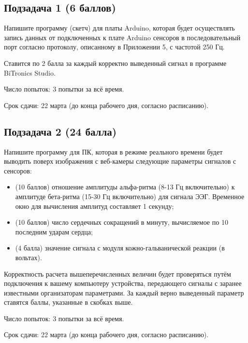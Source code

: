 
\subsection*{Подзадача 1 (6 баллов)}

Напишите программу (скетч) для платы Arduino, которая будет осуществлять запись данных от подключенных к плате Arduino сенсоров в последовательный порт согласно протоколу, описанному в Приложении 5, с частотой 250 Гц.

\markSection

Ставится по 2 балла за каждый корректно выведенный сигнал в программе BiTronics Studio.

Число попыток: 3 попытки за всё время.

Срок сдачи: 22 марта (до конца рабочего дня, согласно расписанию).

\subsection*{Подзадача 2 (24 балла)}

Напишите программу для ПК, которая в режиме реального времени будет выводить поверх изображения с веб-камеры следующие параметры сигналов с сенсоров:
\begin{itemize}
    \item (10 баллов) отношение амплитуды альфа-ритма (8-13 Гц включительно) к амплитуде бета-ритма (15-30 Гц включительно) для сигнала ЭЭГ. Временное окно для вычисления амплитуд составляет 1 секунду;
    \item (10 баллов) число сердечных сокращений в минуту, вычисляемое по 10 последним ударам сердца;
    \item (4 балла) значение сигнала с модуля кожно-гальванической реакции (в вольтах).
\end{itemize}

\markSection

Корректность расчета вышеперечисленных величин будет проверяться путём подключения к вашему компьютеру устройства, передающего сигналы с заранее известными организаторам параметрами. За каждый верно выведенный параметр ставятся баллы, указанные в скобках выше. 

Число попыток: 3 попытки за всё время.

Срок сдачи: 22 марта (до конца рабочего дня, согласно расписанию).
